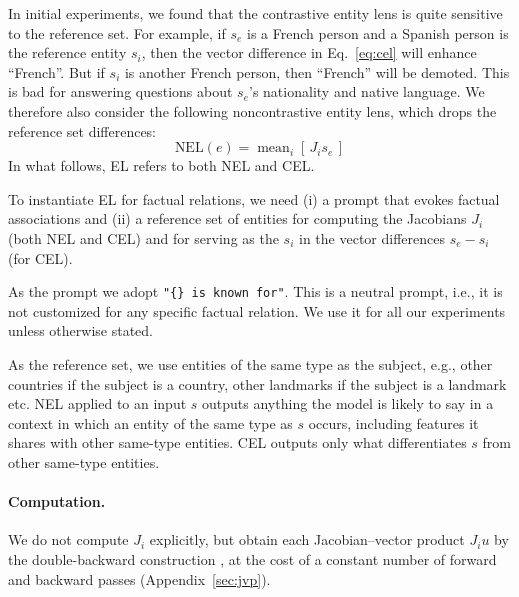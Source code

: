 In initial experiments, we found that the contrastive entity
lens is quite sensitive to the reference set. For example,
if $s_e$ is a French person and a Spanish person is the
reference entity $s_i$, then the vector difference in 
Eq.~\ref{eq:cel} will enhance ``French''. But if $s_i$ is
another French person, then ``French'' will be demoted.
This is bad for answering questions about $s_e$'s
nationality and native language. We therefore also consider
the following noncontrastive entity lens, which drops the
reference set differences:
\begin{equation}
\mbox{NEL}(e) = \operatorname{mean}_i\!\left[\, J_i s_e \,\right]
\label{eq:nel}
\end{equation}
In what follows,
EL refers to both NEL and CEL.


To instantiate EL for factual
relations, we need (i) a prompt that evokes factual associations
and (ii) a reference set of entities for computing the Jacobians $J_i$
(both NEL and CEL) and for serving as the $s_i$ in the
vector differences $s_e - s_i$ (for CEL).

As the prompt we adopt \texttt{"\{\} is known for"}. This is a neutral prompt, i.e.,
it is not customized for any specific factual relation. We
use it for all our  experiments unless otherwise stated.

As the reference set, we use entities of the same type as
the subject, e.g., other countries if the subject is a
country, other landmarks if the subject is a landmark
etc.
NEL applied to an input $s$ outputs anything the model is likely
to say in a context in which an entity of the same type as $s$ occurs, including features
it shares with other same-type entities.
CEL outputs only what differentiates
$s$ from other same-type entities.


\paragraph{Computation.} We do not compute $J_i$ explicitly, but obtain each
Jacobian--vector product $J_i u$ by the double-backward
construction \citep{pearlmutter1994fast}, at the cost of a constant
number of forward and backward passes (Appendix~\ref{sec:jvp}).


